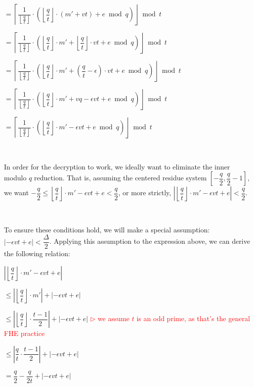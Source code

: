 $= \left\lceil\dfrac{1}{\left\lfloor\frac{q}{t}\right\rfloor} \cdot \left(\left\lfloor\dfrac{q}{t}\right\rfloor \cdot (m' + vt) + e \bmod q\right)\right\rfloor \bmod t$

$= \left\lceil\dfrac{1}{\left\lfloor\frac{q}{t}\right\rfloor} \cdot \left(\left\lfloor\dfrac{q}{t}\right\rfloor \cdot m' + \left\lfloor\dfrac{q}{t}\right\rfloor\cdot vt + e \bmod q\right)\right\rfloor \bmod t$

$= \left\lceil\dfrac{1}{\left\lfloor\frac{q}{t}\right\rfloor} \cdot \left(\left\lfloor\dfrac{q}{t}\right\rfloor \cdot m' + \left(\dfrac{q}{t} - \epsilon \right)\cdot vt + e \bmod q\right)\right\rfloor \bmod t$

$= \left\lceil\dfrac{1}{\left\lfloor\frac{q}{t}\right\rfloor} \cdot \left(\left\lfloor\dfrac{q}{t}\right\rfloor \cdot m' + vq - \epsilon vt + e \bmod q\right)\right\rfloor \bmod t$


$= \left\lceil\dfrac{1}{\left\lfloor\frac{q}{t}\right\rfloor} \cdot \left(\left\lfloor\dfrac{q}{t}\right\rfloor\cdot m'  - \epsilon vt + e \bmod q \right)\right\rfloor \bmod t$ 

$ $

In order for the decryption to work, we ideally want to eliminate the inner modulo $q$ reduction. That is, assuming the centered residue system $\left[-\dfrac{q}{2}, \dfrac{q}{2}-1\right]$, we want $-\dfrac{q}{2} \leq \left\lfloor\dfrac{q}{t}\right\rfloor\cdot m'  - \epsilon vt + e < \dfrac{q}{2}$, or more strictly, $\left|\left\lfloor\dfrac{q}{t}\right\rfloor\cdot m'  - \epsilon vt + e\right| < \dfrac{q}{2}$.

$ $

To ensure these conditions hold, we will make a special assumption: $|-\epsilon vt + e| < \dfrac{\Delta}{2}$. Applying this assumption to the expression above, we can derive the following relation:

$\left|\left\lfloor\dfrac{q}{t}\right\rfloor\cdot m'  - \epsilon vt + e\right| $

$ \leq \left|\left\lfloor\dfrac{q}{t}\right\rfloor\cdot m'\right| + \left|- \epsilon vt + e\right|$

$ \leq \left|\left\lfloor\dfrac{q}{t}\right\rfloor\cdot \dfrac{t-1}{2}\right| + \left|- \epsilon vt + e\right|$ \textcolor{red}{ $\rhd$ we assume $t$ is an odd prime, as that's the general FHE practice}

$ \leq \left|\dfrac{q}{t}\cdot \dfrac{t-1}{2}\right| + \left|- \epsilon vt + e\right|$

$ = \dfrac{q}{2} - \dfrac{q}{2t} + \left|- \epsilon vt + e\right|$

